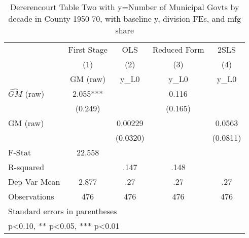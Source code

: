 \begin{table}[htbp]\centering
\def\sym#1{\ifmmode^{#1}\else\(^{#1}\)\fi}
\caption{Dererencourt Table Two with y=Number of Municipal Govts by decade in County 1950-70, with baseline y, division FEs, and mfg share}
\begin{tabular}{l*{4}{c}}
\toprule
                    & First Stage   &         OLS   &Reduced Form   &        2SLS   \\
                    &\multicolumn{1}{c}{(1)}&\multicolumn{1}{c}{(2)}&\multicolumn{1}{c}{(3)}&\multicolumn{1}{c}{(4)}\\
                    &\multicolumn{1}{c}{GM  (raw)}&\multicolumn{1}{c}{y\_L0}&\multicolumn{1}{c}{y\_L0}&\multicolumn{1}{c}{y\_L0}\\
\midrule
$\hat{GM}$ (raw)    &       2.055***&               &       0.116   &               \\
                    &     (0.249)   &               &     (0.165)   &               \\
\addlinespace
GM  (raw)           &               &     0.00229   &               &      0.0563   \\
                    &               &    (0.0320)   &               &    (0.0811)   \\
\midrule
F-Stat              &      22.558   &               &               &               \\
R-squared           &               &        .147   &        .148   &               \\
Dep Var Mean        &       2.877   &         .27   &         .27   &         .27   \\
Observations        &         476   &         476   &         476   &         476   \\
\bottomrule
\multicolumn{5}{l}{\footnotesize Standard errors in parentheses}\\
\multicolumn{5}{l}{\footnotesize * p<0.10, ** p<0.05, *** p<0.01}\\
\end{tabular}
\end{table}
